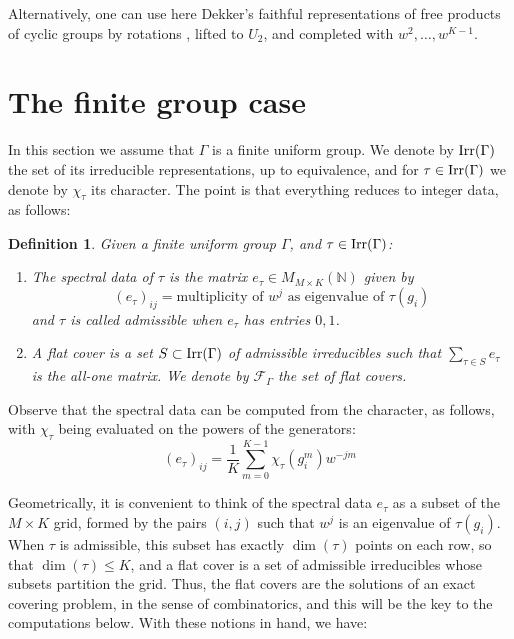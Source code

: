 \documentclass[12pt]{amsart}
\newtheorem{definition}[theorem]{Definition}
\theoremstyle{definition}
\begin{document}
Alternatively, one can use here Dekker's faithful representations of free products of cyclic groups by rotations \cite{dek}, lifted to $U_2$, and completed with $w^2,\ldots,w^{K-1}$.

\section{The finite group case}

In this section we assume that $\Gamma$ is a finite uniform group. We denote by ${\rm Irr}(\Gamma)$ the set of its irreducible representations, up to equivalence, and for $\tau\in{\rm Irr}(\Gamma)$ we denote by $\chi_\tau$ its character. The point is that everything reduces to integer data, as follows:

\begin{definition}
Given a finite uniform group $\Gamma$, and $\tau\in{\rm Irr}(\Gamma)$:
\begin{enumerate}
\item The spectral data of $\tau$ is the matrix $e_\tau\in M_{M\times K}(\mathbb N)$ given by
$$(e_\tau)_{ij}=\text{multiplicity of $w^j$ as eigenvalue of $\tau(g_i)$}$$
and $\tau$ is called admissible when $e_\tau$ has entries $0,1$.

\item A flat cover is a set $S\subset{\rm Irr}(\Gamma)$ of admissible irreducibles such that $\sum_{\tau\in S}e_\tau$ is the all-one matrix. We denote by $\mathcal F_\Gamma$ the set of flat covers.
\end{enumerate}
\end{definition}

Observe that the spectral data can be computed from the character, as follows, with $\chi_\tau$ being evaluated on the powers of the generators:
$$(e_\tau)_{ij}=\frac{1}{K}\sum_{m=0}^{K-1}\chi_\tau(g_i^m)w^{-jm}$$

Geometrically, it is convenient to think of the spectral data $e_\tau$ as a subset of the $M\times K$ grid, formed by the pairs $(i,j)$ such that $w^j$ is an eigenvalue of $\tau(g_i)$. When $\tau$ is admissible, this subset has exactly $\dim(\tau)$ points on each row, so that $\dim(\tau)\leq K$, and a flat cover is a set of admissible irreducibles whose subsets partition the grid. Thus, the flat covers are the solutions of an exact covering problem, in the sense of combinatorics, and this will be the key to the computations below. With these notions in hand, we have:
\end{document}
